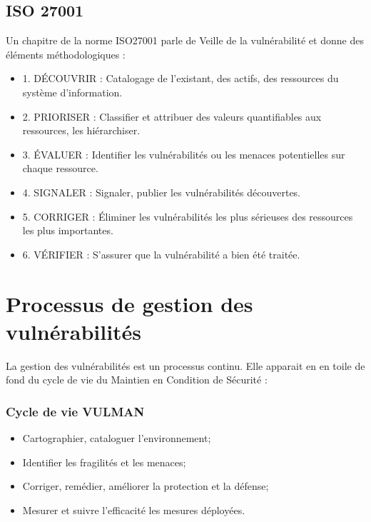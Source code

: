 \subsection{ISO 27001}

Un chapitre de la norme ISO27001 parle de Veille de la vulnérabilité et donne des éléments méthodologiques : 

\begin{itemize}
	\item 1. DÉCOUVRIR : Catalogage de l’existant, des actifs, des ressources du système d’information. 
 	\item 2. PRIORISER : Classifier et attribuer des valeurs quantifiables aux ressources, les hiérarchiser. 
 	\item 3. ÉVALUER : Identifier les vulnérabilités ou les menaces potentielles sur chaque ressource. 
	 \item 4. SIGNALER : Signaler, publier les vulnérabilités découvertes. 
 	\item 5. CORRIGER : Éliminer les vulnérabilités les plus sérieuses des ressources les plus importantes. 
 	\item 6. VÉRIFIER : S’assurer que la vulnérabilité a bien été traitée. 
\end{itemize}


\section{Processus de gestion des vulnérabilités}

La gestion des vulnérabilités est un processus continu. Elle apparait en en toile de fond du cycle de vie du Maintien en Condition de Sécurité :

\begin{frame}
\frametitle<presentation>{Cycle de vie VULMAN}
\begin{itemize}
	\item Cartographier, cataloguer l'environnement; 
	\item Identifier les fragilités et les menaces;
	\item Corriger, remédier, améliorer la protection et la défense;
	\item Mesurer et suivre l'efficacité les mesures déployées.
\end{itemize}
\end{frame}

